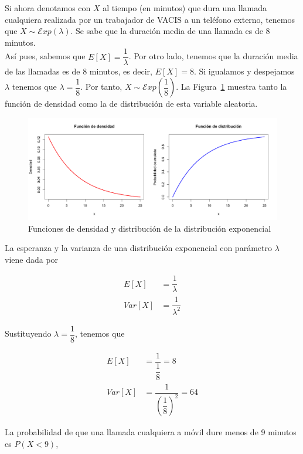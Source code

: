 \documentclass[12pt,a4paper,twoside,openright,titlepage,final]{article}
\begin{document}
Si ahora denotamos con $X$ al tiempo (en minutos) que dura una llamada cualquiera realizada por un trabajador de VACIS a un teléfono externo, tenemos que $X \sim \mathcal{E}xp(\lambda)$. Se sabe que la duración media de una llamada es de 8 minutos.\\

Así pues, sabemos que $E[X] = \dfrac{1}{\lambda}$. Por otro lado, tenemos que la duración media de las llamadas es de 8 minutos, es decir, $E[X] = 8$. Si igualamos y despejamos $\lambda$ tenemos que $\lambda = \dfrac{1}{8}$. Por tanto, $X \sim \mathcal{E}xp\left(\dfrac{1}{8}\right)$. La Figura~\ref{fig:funcion_distribucion_exponencial} muestra tanto la función de densidad como la de distribución de esta variable aleatoria.\\

\begin{figure}[tbph!]
\centering
\includegraphics[width=0.9\linewidth]{imagenes/funcion_distribucion_exponencial}
\caption{Funciones de densidad y distribución de la distribución exponencial}
\label{fig:funcion_distribucion_exponencial}
\end{figure}

La esperanza y la varianza de una distribución exponencial con parámetro $\lambda$ viene dada por

\begin{align*}
E[X] & = \dfrac{1}{\lambda} \\
Var[X] & = \dfrac{1}{\lambda^2}
\end{align*}

Sustituyendo $\lambda  = \dfrac{1}{8}$, tenemos que

\begin{align*}
E[X] & = \dfrac{1}{\dfrac{1}{8}} = 8 \\
Var[X] & = \dfrac{1}{\left(\dfrac{1}{8}\right)^2} = 64
\end{align*}

La probabilidad de que una llamada cualquiera a móvil dure menos de 9 minutos es $P(X < 9)$,
\end{document}
